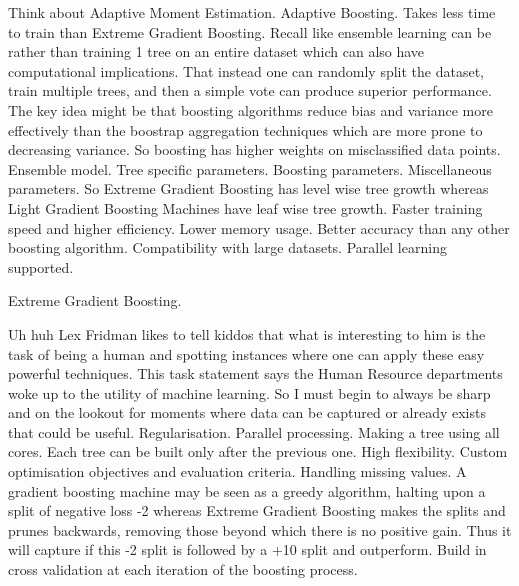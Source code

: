 Think about Adaptive Moment Estimation. Adaptive Boosting. Takes less time to train than Extreme Gradient Boosting. Recall like ensemble learning can be rather than training 1 tree on an entire dataset which can also have computational implications. That instead one can randomly split the dataset, train multiple trees, and then a simple vote can produce superior performance. The key idea might be that boosting algorithms reduce bias and variance more effectively than the boostrap aggregation techniques which are more prone to decreasing variance. So boosting has higher weights on misclassified data points. Ensemble model. Tree specific parameters. Boosting parameters. Miscellaneous parameters. So Extreme Gradient Boosting has level wise tree growth whereas Light Gradient Boosting Machines have leaf wise tree growth. Faster training speed and higher efficiency. Lower memory usage. Better accuracy than any other boosting algorithm. Compatibility with large datasets. Parallel learning supported.

Extreme Gradient Boosting.

Uh huh Lex Fridman likes to tell kiddos that what is interesting to him is the task of being a human and spotting instances where one can apply these easy powerful techniques. This task statement says the Human Resource departments woke up to the utility of machine learning. So I must begin to always be sharp and on the lookout for moments where data can be captured or already exists that could be useful. Regularisation. Parallel processing. Making a tree using all cores. Each tree can be built only after the previous one. High flexibility. Custom optimisation objectives and evaluation criteria. Handling missing values. A gradient boosting machine may be seen as a greedy algorithm, halting upon a split of negative loss -2 whereas Extreme Gradient Boosting makes the splits and prunes backwards, removing those beyond which there is no positive gain. Thus it will capture if this -2 split is followed by a +10 split and outperform. Build in cross validation at each iteration of the boosting process.